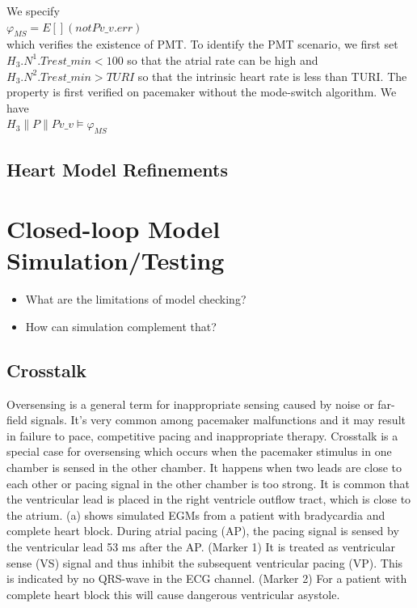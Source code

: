 We specify\\
$\varphi_{MS}=E[] (not Pv\_v.err)$\\
which verifies the existence of PMT. To identify the PMT scenario, we first set $H_3.N^1.Trest\_min<100$ so that the atrial rate can be high and $H_3.N^2.Trest\_min>TURI$ so that the intrinsic heart rate is less than TURI. The property is first verified on pacemaker without the mode-switch algorithm. We have\\
$H_3\|P\|Pv\_v\models\varphi_{MS}$

\section{Heart Model Refinements}
    


\chapter{Closed-loop Model Simulation/Testing}
\begin{itemize}
	\item What are the limitations of model checking?
    \item How can simulation complement that?
\end{itemize}

\section{Crosstalk}
Oversensing is a general term for inappropriate sensing caused by noise or far-field signals. It's very common among pacemaker malfunctions and it may result in failure to pace, competitive pacing and inappropriate therapy. Crosstalk is a special case for oversensing which occurs when the pacemaker stimulus in one chamber is sensed in the other chamber. It happens when two leads are close to each other or pacing signal in the other chamber is too strong. It is common that the ventricular lead is placed in the right ventricle outflow tract, which is close to the atrium. (a) shows simulated EGMs from a patient with bradycardia and complete heart block. During atrial pacing (AP), the pacing signal is sensed by the ventricular lead 53 ms after the AP. (Marker 1) It is treated as ventricular sense (VS) signal and thus inhibit the subsequent ventricular pacing (VP). This is indicated by no QRS-wave in the ECG channel. (Marker 2) For a patient with complete heart block this will cause dangerous ventricular asystole.  

